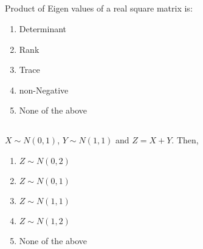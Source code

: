 \begin{frame}
\section{}
  Product of Eigen values of a real square matrix is:
    \begin{enumerate}[label=(\Alph*)]
         \item Determinant
         \item Rank
         \item Trace
         \item non-Negative
         \item None of the above
    \end{enumerate}
\end{frame}

\begin{frame}
\section{}
  $X\sim N(0,1)$, $Y\sim N(1,1)$ and $Z=X+Y$. Then,
     \begin{enumerate}[label=(\Alph*)]
         \item $Z\sim N(0,2)$
         \item $Z\sim N(0,1)$
         \item $Z\sim N(1,1)$
         \item $Z\sim N(1,2)$ %
         \item None of the above
     \end{enumerate}
\end{frame}
